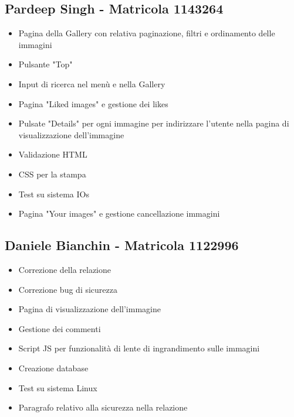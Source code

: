 \documentclass[openany, a4paper, 12pt]{report}
\begin{document}
	\subsection{Pardeep Singh - Matricola 1143264}
	\begin{itemize}
		\item Pagina della Gallery con relativa paginazione, filtri e ordinamento delle immagini
		\item Pulsante "Top"
		\item Input di ricerca nel menù e nella Gallery
		\item Pagina "Liked images" e gestione dei likes
		\item Pulsate "Details" per ogni immagine per indirizzare l'utente nella pagina di visualizzazione dell'immagine 
		\item Validazione HTML
		\item CSS per la stampa
		\item Test su sistema IOs
		\item Pagina "Your images" e gestione cancellazione immagini
	\end{itemize}
	\subsection{Daniele Bianchin - Matricola 1122996}
	\begin{itemize}
		\item Correzione della relazione
		\item Correzione bug di sicurezza
		\item Pagina di visualizzazione dell'immagine
		\item Gestione dei commenti
		\item Script JS per funzionalità di lente di ingrandimento sulle immagini
		\item Creazione database
		\item Test su sistema Linux
		\item Paragrafo relativo alla sicurezza nella relazione
	\end{itemize}
\end{document}
